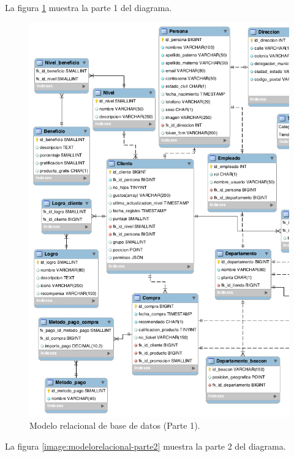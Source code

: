 La figura \ref{image:modelorelacional-parte1} muestra la parte 1 del diagrama.

\FloatBarrier
\begin{figure}[htbp!]
		\centering
			\includegraphics[width=.82 \textwidth]{imagenes/modeloDatos/modelorelacional_1}
		\caption{Modelo relacional de base de datos (Parte 1).}
		\label{image:modelorelacional-parte1}
\end{figure}
\FloatBarrier

La figura \ref{image:modelorelacional-parte2} muestra la parte 2 del diagrama.

